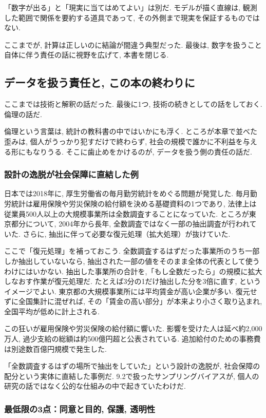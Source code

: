 「数字が出る」と「現実に当てはめてよい」は別だ.
モデルが描く直線は, 観測した範囲で関係を要約する道具であって, その外側まで現実を保証するものではない.

ここまでが, 計算は正しいのに結論が間違う典型だった.
最後は, 数字を扱うこと自体に伴う責任の話に視野を広げて, 本書を閉じる.


\subsection{データを扱う責任と, この本の終わりに}

ここまでは技術と解釈の話だった.
最後に1つ, 技術の続きとしての話をしておく. 倫理の話だ.

倫理という言葉は, 統計の教科書の中ではいかにも浮く.
ところが本章で並べた歪みは, 個人がうっかり犯すだけで終わらず, 社会の規模で誰かに不利益を与える形にもなりうる.
そこに歯止めをかけるのが, データを扱う側の責任の話だ.

\subsubsection*{設計の逸脱が社会保障に直結した例}

日本では2018年に, 厚生労働省の毎月勤労統計をめぐる問題が発覚した.
毎月勤労統計は雇用保険や労災保険の給付額を決める基礎資料の1つであり, 法律上は従業員500人以上の大規模事業所は全数調査することになっていた.
ところが東京都分について, 2004年から長年, 全数調査ではなく一部の抽出調査が行われていた.
さらに, 抽出に伴って必要な復元処理（拡大処理）が抜けていた.

ここで「復元処理」を補っておこう.
全数調査するはずだった事業所のうち一部しか抽出していないなら, 抽出された一部の値をそのまま全体の代表として使うわけにはいかない.
抽出した事業所の合計を,「もし全数だったら」の規模に拡大しなおす作業が復元処理だ.
たとえば3分の1だけ抽出した分を3倍に直す, というイメージでよい.
東京都の大規模事業所には平均賃金が高い企業が多い. 復元せずに全国集計に混ぜれば, その「賃金の高い部分」が本来より小さく取り込まれ, 全国平均が低めに計上される.

この狂いが雇用保険や労災保険の給付額に響いた.
影響を受けた人は延べ約2{,}000万人, 過少支給の総額は約500億円超と公表されている.
追加給付のための事務費は別途数百億円規模で発生した.

「全数調査するはずの場所で抽出をしていた」という設計の逸脱が, 社会保障の配分という実体に直結した事例だ.
9.2で扱ったサンプリングバイアスが, 個人の研究の話ではなく公的な仕組みの中で起きていたわけだ.

\subsubsection*{最低限の3点：同意と目的, 保護, 透明性}

